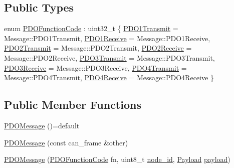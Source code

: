 \subsection*{Public Types}
\begin{DoxyCompactItemize}
\item 
enum \hyperlink{class_c_a_nopen_1_1_p_d_o_message_ab46579ce08cec30d0bc60428053cb39f}{P\+D\+O\+Function\+Code} \+: uint32\+\_\+t \{ \newline
\hyperlink{class_c_a_nopen_1_1_p_d_o_message_ab46579ce08cec30d0bc60428053cb39fabfcc66bfc93e03a72bb931e5bd636798}{P\+D\+O1\+Transmit} = Message\+:\+:P\+D\+O1\+Transmit, 
\hyperlink{class_c_a_nopen_1_1_p_d_o_message_ab46579ce08cec30d0bc60428053cb39fa01d2d22755748fca5086b2e4bf6b009e}{P\+D\+O1\+Receive} = Message\+:\+:P\+D\+O1\+Receive, 
\hyperlink{class_c_a_nopen_1_1_p_d_o_message_ab46579ce08cec30d0bc60428053cb39fa13229b4458d1949639c4e635cda6689c}{P\+D\+O2\+Transmit} = Message\+:\+:P\+D\+O2\+Transmit, 
\hyperlink{class_c_a_nopen_1_1_p_d_o_message_ab46579ce08cec30d0bc60428053cb39fa2e653900b8cea5673b6c829c0d40b0f2}{P\+D\+O2\+Receive} = Message\+:\+:P\+D\+O2\+Receive, 
\newline
\hyperlink{class_c_a_nopen_1_1_p_d_o_message_ab46579ce08cec30d0bc60428053cb39fa508480956655988cac3696b73e542753}{P\+D\+O3\+Transmit} = Message\+:\+:P\+D\+O3\+Transmit, 
\hyperlink{class_c_a_nopen_1_1_p_d_o_message_ab46579ce08cec30d0bc60428053cb39fa54205762ad0ee3cae8ff88519454fd2b}{P\+D\+O3\+Receive} = Message\+:\+:P\+D\+O3\+Receive, 
\hyperlink{class_c_a_nopen_1_1_p_d_o_message_ab46579ce08cec30d0bc60428053cb39fa67325f4e5dfd2ce6a2214a73997ac09d}{P\+D\+O4\+Transmit} = Message\+:\+:P\+D\+O4\+Transmit, 
\hyperlink{class_c_a_nopen_1_1_p_d_o_message_ab46579ce08cec30d0bc60428053cb39fa73eba51ebd0e854b545554bf9c92091b}{P\+D\+O4\+Receive} = Message\+:\+:P\+D\+O4\+Receive
 \}
\end{DoxyCompactItemize}
\subsection*{Public Member Functions}
\begin{DoxyCompactItemize}
\item 
\hyperlink{class_c_a_nopen_1_1_p_d_o_message_a9a38d99b2d049eccc56efb307f3619e6}{P\+D\+O\+Message} ()=default
\item 
\hyperlink{class_c_a_nopen_1_1_p_d_o_message_a461a62c471761504043dfcb13f9ec685}{P\+D\+O\+Message} (const can\+\_\+frame \&other)
\item 
\hyperlink{class_c_a_nopen_1_1_p_d_o_message_ae7f8db2be338aaa9cc61f08520fa0c85}{P\+D\+O\+Message} (\hyperlink{class_c_a_nopen_1_1_p_d_o_message_ab46579ce08cec30d0bc60428053cb39f}{P\+D\+O\+Function\+Code} fn, uint8\+\_\+t \hyperlink{class_c_a_nopen_1_1_message_a845fe0c7682bd6eeef0a5dd87b5e3c63}{node\+\_\+id}, \hyperlink{class_c_a_nopen_1_1_payload}{Payload} \hyperlink{class_c_a_nopen_1_1_message_a65be4f77771803bed521cbbf2316271b}{payload})
\end{DoxyCompactItemize}


